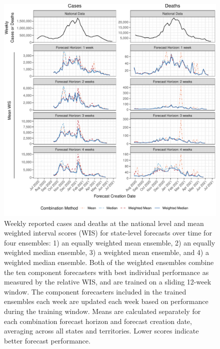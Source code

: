 \documentclass[review]{elsarticle}
\begin{document}
\begin{figure}
  \includegraphics[width=\textwidth]{figures/scores_by_week.pdf}
  \caption{Weekly reported cases and deaths at the national level and mean weighted interval scores (WIS) for state-level forecasts over time for four ensembles:
  1) an equally weighted mean ensemble, 2) an equally weighted median ensemble, 3) a weighted mean ensemble, and 4) a weighted median ensemble.
  Both of the weighted ensembles combine the ten component forecasters with best individual performance as measured by the relative WIS, and are trained on a sliding 12-week window.
  The component forecasters included in the trained ensembles each week are updated each week based on performance during the training window.
  Means are calculated separately for each combination forecast horizon and forecast creation date, averaging across all states and territories.
  Lower scores indicate better forecast performance.}
  \label{fig:WIS_over_time}
\end{figure}
\end{document}
